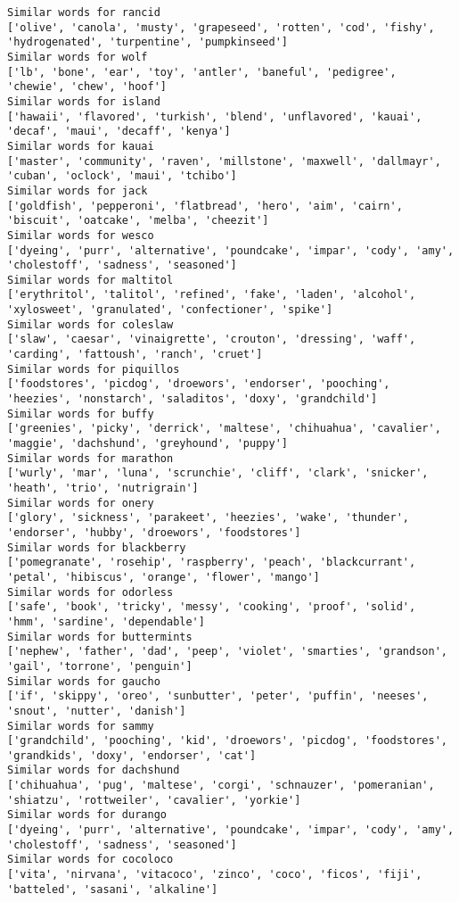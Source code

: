 \documentclass[11pt]{article}
\begin{document}
\begin{Verbatim}[commandchars=\\\{\}]
Similar words for rancid
['olive', 'canola', 'musty', 'grapeseed', 'rotten', 'cod', 'fishy', 'hydrogenated', 'turpentine', 'pumpkinseed']
Similar words for wolf
['lb', 'bone', 'ear', 'toy', 'antler', 'baneful', 'pedigree', 'chewie', 'chew', 'hoof']
Similar words for island
['hawaii', 'flavored', 'turkish', 'blend', 'unflavored', 'kauai', 'decaf', 'maui', 'decaff', 'kenya']
Similar words for kauai
['master', 'community', 'raven', 'millstone', 'maxwell', 'dallmayr', 'cuban', 'oclock', 'maui', 'tchibo']
Similar words for jack
['goldfish', 'pepperoni', 'flatbread', 'hero', 'aim', 'cairn', 'biscuit', 'oatcake', 'melba', 'cheezit']
Similar words for wesco
['dyeing', 'purr', 'alternative', 'poundcake', 'impar', 'cody', 'amy', 'cholestoff', 'sadness', 'seasoned']
Similar words for maltitol
['erythritol', 'talitol', 'refined', 'fake', 'laden', 'alcohol', 'xylosweet', 'granulated', 'confectioner', 'spike']
Similar words for coleslaw
['slaw', 'caesar', 'vinaigrette', 'crouton', 'dressing', 'waff', 'carding', 'fattoush', 'ranch', 'cruet']
Similar words for piquillos
['foodstores', 'picdog', 'droewors', 'endorser', 'pooching', 'heezies', 'nonstarch', 'saladitos', 'doxy', 'grandchild']
Similar words for buffy
['greenies', 'picky', 'derrick', 'maltese', 'chihuahua', 'cavalier', 'maggie', 'dachshund', 'greyhound', 'puppy']
Similar words for marathon
['wurly', 'mar', 'luna', 'scrunchie', 'cliff', 'clark', 'snicker', 'heath', 'trio', 'nutrigrain']
Similar words for onery
['glory', 'sickness', 'parakeet', 'heezies', 'wake', 'thunder', 'endorser', 'hubby', 'droewors', 'foodstores']
Similar words for blackberry
['pomegranate', 'rosehip', 'raspberry', 'peach', 'blackcurrant', 'petal', 'hibiscus', 'orange', 'flower', 'mango']
Similar words for odorless
['safe', 'book', 'tricky', 'messy', 'cooking', 'proof', 'solid', 'hmm', 'sardine', 'dependable']
Similar words for buttermints
['nephew', 'father', 'dad', 'peep', 'violet', 'smarties', 'grandson', 'gail', 'torrone', 'penguin']
Similar words for gaucho
['if', 'skippy', 'oreo', 'sunbutter', 'peter', 'puffin', 'neeses', 'snout', 'nutter', 'danish']
Similar words for sammy
['grandchild', 'pooching', 'kid', 'droewors', 'picdog', 'foodstores', 'grandkids', 'doxy', 'endorser', 'cat']
Similar words for dachshund
['chihuahua', 'pug', 'maltese', 'corgi', 'schnauzer', 'pomeranian', 'shiatzu', 'rottweiler', 'cavalier', 'yorkie']
Similar words for durango
['dyeing', 'purr', 'alternative', 'poundcake', 'impar', 'cody', 'amy', 'cholestoff', 'sadness', 'seasoned']
Similar words for cocoloco
['vita', 'nirvana', 'vitacoco', 'zinco', 'coco', 'ficos', 'fiji', 'batteled', 'sasani', 'alkaline']

\end{Verbatim}
\end{document}
